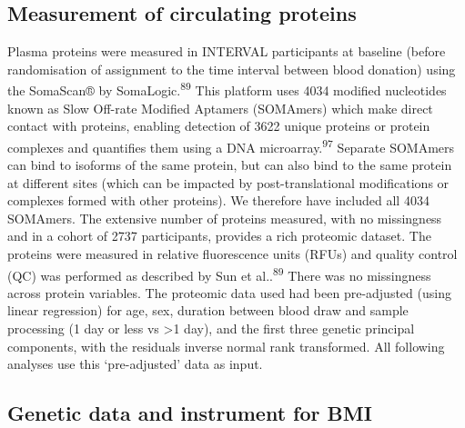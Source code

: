 \documentclass[11pt,twoside]{bristolthesis}
\begin{document}
\hypertarget{measurement-of-circulating-proteins}{%
\subsection{Measurement of circulating proteins}\label{measurement-of-circulating-proteins}}

Plasma proteins were measured in INTERVAL participants at baseline (before randomisation of assignment to the time interval between blood donation) using the SomaScan® by SomaLogic.\textsuperscript{89} This platform uses 4034 modified nucleotides known as Slow Off-rate Modified Aptamers (SOMAmers) which make direct contact with proteins, enabling detection of 3622 unique proteins or protein complexes and quantifies them using a DNA microarray.\textsuperscript{97} Separate SOMAmers can bind to isoforms of the same protein, but can also bind to the same protein at different sites (which can be impacted by post-translational modifications or complexes formed with other proteins). We therefore have included all 4034 SOMAmers. The extensive number of proteins measured, with no missingness and in a cohort of 2737 participants, provides a rich proteomic dataset. The proteins were measured in relative fluorescence units (RFUs) and quality control (QC) was performed as described by Sun et al..\textsuperscript{89} There was no missingness across protein variables. The proteomic data used had been pre-adjusted (using linear regression) for age, sex, duration between blood draw and sample processing (1 day or less vs \textgreater1 day), and the first three genetic principal components, with the residuals inverse normal rank transformed. All following analyses use this `pre-adjusted' data as input.

\hypertarget{genetic-data-and-instrument-for-bmi}{%
\subsection{Genetic data and instrument for BMI}\label{genetic-data-and-instrument-for-bmi}}
\end{document}
